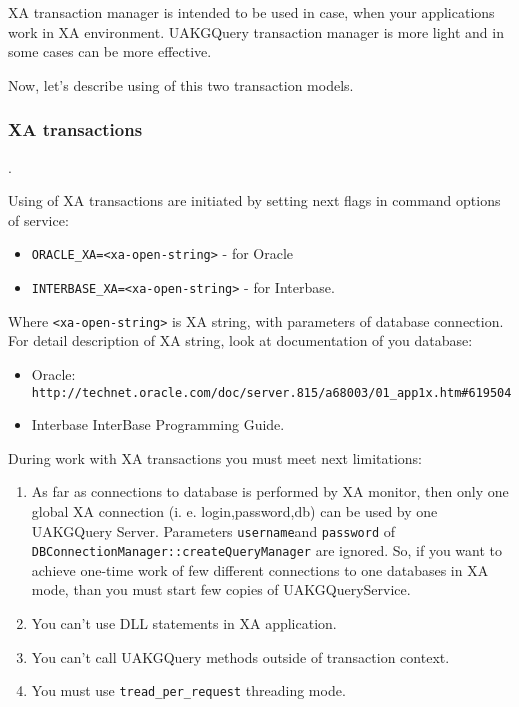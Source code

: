 \documentclass[10pt]{article}
\begin{document}
 XA transaction manager is intended to be used in case, when your applications work
 in XA environment. UAKGQuery transaction manager is more light and
 in some cases can be more effective.
 
 Now, let's describe using of this two transaction models.

 \subsubsection{XA transactions}.

  Using of XA transactions are initiated by setting next flags in
command options of service:
 \begin{itemize}
   \item \verb|ORACLE_XA=<xa-open-string>| - for Oracle
   \item \verb|INTERBASE_XA=<xa-open-string>| - for Interbase.
 \end{itemize}
  
 Where \verb|<xa-open-string>| is XA string, with parameters of
database connection.
 For detail description of  XA string, look at documentation of
you database:
 \begin{itemize}
  \item Oracle:
   \verb|http://technet.oracle.com/doc/server.815/a68003/01_app1x.htm#619504|
  \item Interbase
    InterBase Programming Guide.
 \end{itemize}

 During work with XA transactions you must meet next limitations:

 \begin{enumerate}
  \item As far as connections to database is performed by XA monitor, then
   only one global XA connection (i. e. login,password,db) can be
 used by one UAKGQuery Server. Parameters \verb|username|and \verb|password|
 of \verb|DBConnectionManager::createQueryManager| are ignored.
 So, if you want to achieve one-time work of few different connections
 to one databases in XA mode, than you must start few copies of 
 UAKGQueryService.
  \item You can't use DLL statements in XA application.
  \item You can't call UAKGQuery methods outside of transaction context.
  \item You must use \verb|tread_per_request| threading mode.
 \end{enumerate}
\end{document}
